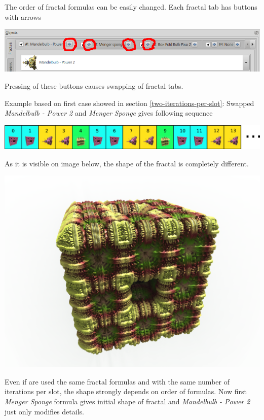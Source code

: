The order of fractal formulas can be easily changed. Each fractal tab has buttons with arrows

\includegraphics[width=\linewidth]{img/manual/media/fractal_tabs_with_defined_fractals_arrows.png}

Pressing of these buttons causes swapping of fractal tabs.

Example based on first case showed in section \ref{two-iterations-per-slot}:  Swapped \emph{Mandelbulb - Power 2} and \emph{Menger Sponge} gives following sequence 

\includegraphics[width=\linewidth]{img/manual/media/iteration_loop_hybrid_sequence_5.png}

As it is visible on image below, the shape of the fractal is completely different.\nopagebreak

\includegraphics[width=0.7\linewidth]{img/manual/media/hybrid_sequence_example_5.png}

Even if are used the same fractal formulas and with the same number of iterations per slot, the shape strongly depends on order of formulas. Now first \emph{Menger Sponge} formula gives initial shape of fractal and \emph{Mandelbulb - Power 2} just only modifies details.
